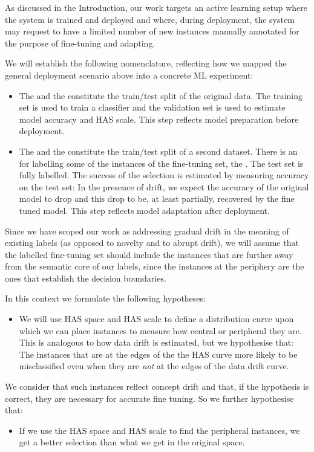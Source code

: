 

As discussed in the Introduction, our work targets an active learning
setup where the system is trained and deployed and where, during
deployment, the system may request to have a limited number of new
instances manually annotated for the purpose of fine-tuning and
adapting.

We will establish the following nomenclature, reflecting how we mapped
the general deployment scenario above into a concrete ML experiment:
%
\begin{itemize}
\item The  and the 
  constitute the train/test split of the original data.
  The training set is used to train a classifier and the
  validation set is used to estimate model accuracy and HAS scale.
  This step reflects model preparation before deployment.
\item The  and the  constitute
  the train/test split of a second dataset. There is an
   for labelling some of the instances of
  the fine-tuning set, the .
  The test set is fully labelled.
  The success of the selection is estimated by measuring accuracy on
  the test set: In the presence of drift, we expect the accuracy of
  the original model to drop and this drop to be, at least partially,
  recovered by the fine tuned model.
  This step reflects model adaptation after deployment.
\end{itemize}

Since we have scoped our work as addressing gradual drift in the
meaning of existing labels (as opposed to novelty and to abrupt
drift), we will assume that the labelled fine-tuning set should
include the instances that are further away from the semantic core of
our labels, since the instances at the periphery are the ones that
establish the decision boundaries.

In this context we formulate the following hypotheses:
%
\begin{itemize}
\item[\textbf{H1}] We will use HAS space and HAS scale to define a
  distribution curve upon which we can place instances to measure how
  central or peripheral they are. This is analogous to how data drift
  is estimated, but we hypothesise that: The instances that are at the
  edges of the the HAS curve more likely to be misclassified even when
  they are \emph{not} at the edges of the data drift curve.
\end{itemize}
%
We consider that such instances reflect concept drift and that, if the
hypothesis is correct, they are necessary for accurate fine tuning.
So we further hypothesise that:
%
\begin{itemize}
\item[\textbf{H2}] If we use the HAS space and HAS scale to find the
  peripheral instances, we get a better selection than what we get in
  the original space.
\end{itemize}

